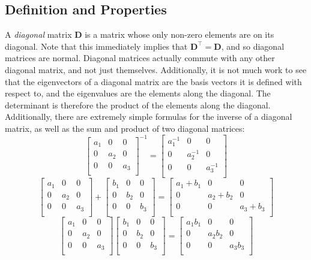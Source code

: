 \documentclass{article}
\begin{document}
\subsection{Definition and Properties}
A \textit{diagonal} matrix $\mathbf{D}$ is a matrix whose only non-zero elements are on its diagonal. Note that this immediately implies that $\mathbf{D^{\top}} = \mathbf{D}$, and so diagonal matrices are normal. Diagonal matrices actually commute with any other diagonal matrix, and not just themselves. Additionally, it is not much work to see that the eigenvectors of a diagonal matrix are the basis vectors it is defined with respect to, and the eigenvalues are the elements along the diagonal. The determinant is therefore the product of the elements along the diagonal. Additionally, there are extremely simple formulas for the inverse of a diagonal matrix, as well as the sum and product of two diagonal matrices: $$\begin{bmatrix} a_1 & 0 & 0 \\ 0 & a_2 & 0 \\ 0 & 0 & a_3 \\ \end{bmatrix}^{-1} = \begin{bmatrix} a_1^{-1} & 0 & 0 \\ 0 & a_2^{-1} & 0 \\ 0 & 0 & a_3^{-1} \\ \end{bmatrix} $$ $$\begin{bmatrix} a_1 & 0 & 0 \\ 0 & a_2 & 0 \\ 0 & 0 & a_3 \\ \end{bmatrix} + \begin{bmatrix} b_1 & 0 & 0 \\ 0 & b_2 & 0 \\ 0 & 0 & b_3 \\ \end{bmatrix} = \begin{bmatrix} a_1+b_1 & 0 & 0 \\ 0 & a_2+b_2 & 0 \\ 0 & 0 & a_3+b_3 \\ \end{bmatrix} $$ $$\begin{bmatrix} a_1 & 0 & 0 \\ 0 & a_2 & 0 \\ 0 & 0 & a_3 \\ \end{bmatrix}\begin{bmatrix} b_1 & 0 & 0 \\ 0 & b_2 & 0 \\ 0 & 0 & b_3 \\ \end{bmatrix} = \begin{bmatrix} a_1b_1 & 0 & 0 \\ 0 & a_2b_2 & 0 \\ 0 & 0 & a_3b_3 \\ \end{bmatrix} $$
\end{document}
